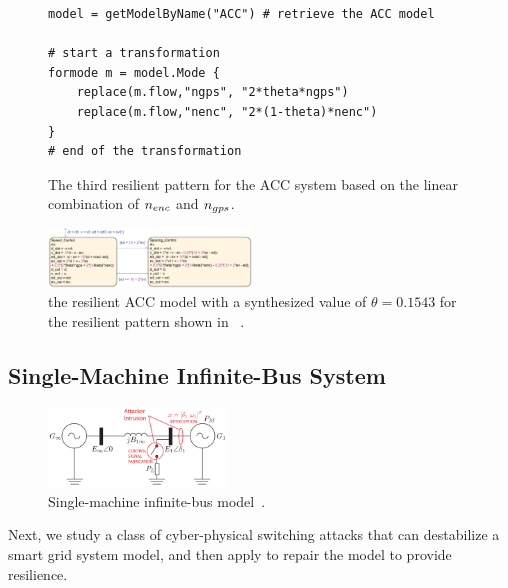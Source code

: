 \begin{figure}[!t]%
\begin{lstlisting}[basicstyle=\ttfamily\footnotesize, numbers=none]
model = getModelByName("ACC") # retrieve the ACC model

# start a transformation  
formode m = model.Mode {
    replace(m.flow,"ngps", "2*theta*ngps")
    replace(m.flow,"nenc", "2*(1-theta)*nenc")
}
# end of the transformation
\end{lstlisting}
\caption{The third resilient pattern for the ACC system based on the linear combination of $n_{enc}$ and $n_{gps}$.}%
%
\end{figure}


\begin{figure}[t!]%
	\centering%
    \includegraphics[width=0.48\textwidth]{image/acc_model_pat3}%
	\caption{the resilient ACC model with a synthesized value of $\theta = 0.1543$ for the resilient pattern shown in ~.}%
\end{figure}%




\subsection{Single-Machine Infinite-Bus System}
%

\begin{figure}[t!]%
	\centering%
    \includegraphics[width=0.42\textwidth]{image/smib}%
	\caption{Single-machine infinite-bus model~\cite{farraj2014practical}.}%
\end{figure}%

Next, we study a class of cyber-physical switching attacks that can destabilize a smart grid system model, and then apply \toolreaffirm to repair the model to provide resilience. 


